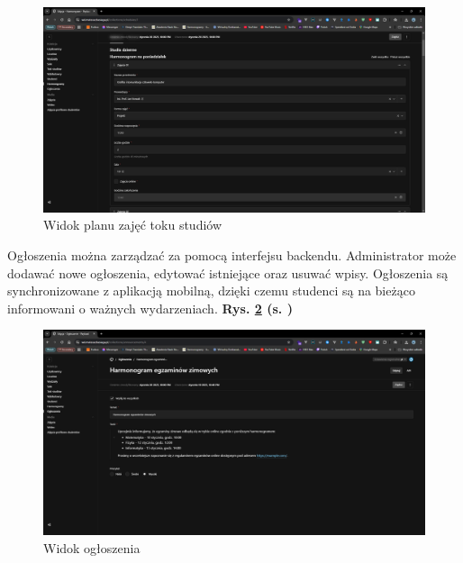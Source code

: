 \begin{figure}[htp!]
	\centering
	\includegraphics[width=\textwidth]{rys/be-schedule.png}
	\caption{Widok planu zajęć toku studiów}
	\label{rys:be-schedule}
\end{figure}
\newpage
Ogłoszenia można zarządzać za pomocą interfejsu backendu. Administrator może dodawać nowe ogłoszenia, edytować istniejące oraz usuwać wpisy. Ogłoszenia są synchronizowane z aplikacją mobilną, dzięki czemu studenci są na bieżąco informowani o ważnych wydarzeniach. \textbf{Rys. \ref{rys:be-announcement} (s. \pageref{rys:be-announcement})}

\begin{figure}[htp!]
	\centering
	\includegraphics[width=\textwidth]{rys/be-announcement.png}
	\caption{Widok ogłoszenia}
	\label{rys:be-announcement}
\end{figure}

\nocite{www1}
\nocite{www2}
\nocite{www3}
\nocite{www4}
\nocite{www5}
\nocite{www6}
\nocite{www7}
\nocite{www8}
\nocite{www9}
\nocite{www10}
\nocite{www11}
\nocite{www12}
